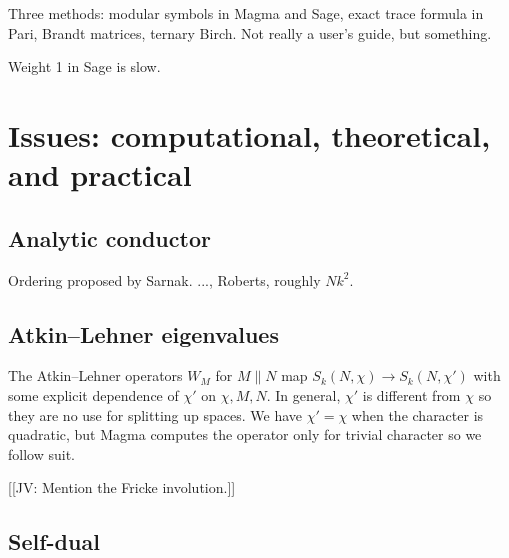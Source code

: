 \documentclass[11pt]{amsart}
\numberwithin{equation}{subsection}
\theoremstyle{plain}
\theoremstyle{definition}
\newcommand{\jv}[1]{{\color{red} \textsf{[[JV: #1]]}}}
\begin{document}
Three methods: modular symbols in Magma and Sage, exact trace formula in Pari, Brandt matrices, ternary Birch.  Not really a user's guide, but something.  

Weight 1 in Sage is slow.  

\section{Issues: computational, theoretical, and practical} \label{sec:issues}

\subsection{Analytic conductor}

Ordering proposed by Sarnak.  ..., Roberts, roughly $Nk^2$.  

\subsection{Atkin--Lehner eigenvalues}

The Atkin--Lehner operators $W_M$ for $M \parallel N$ map $S_k(N,\chi) \to S_k(N,\chi')$ with some explicit dependence of $\chi'$ on $\chi, M, N$.  In general, $\chi'$ is different from $\chi$ so they are no use for splitting up spaces.  We have $\chi'=\chi$ when the character is quadratic, but Magma computes the operator only for trivial character so we follow suit.  

\jv{Mention the Fricke involution.}

\subsection{Self-dual}
\end{document}

